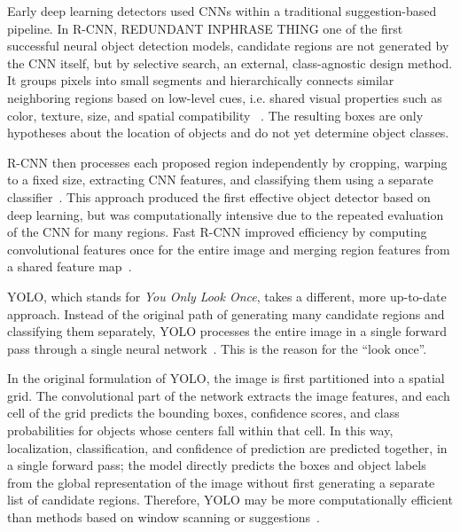 Early deep learning detectors used CNNs within a traditional suggestion-based pipeline. In R-CNN, REDUNDANT INPHRASE THING one of the first successful neural object detection models, candidate regions are not generated by the CNN itself, but by selective search, an external, class-agnostic design method. It groups pixels into small segments and hierarchically connects similar neighboring regions based on low-level cues, i.e. shared visual properties such as color, texture, size, and spatial compatibility ~\cite{uijlings_selective_2013}. The resulting boxes are only hypotheses about the location of objects and do not yet determine object classes.

R-CNN then processes each proposed region independently by cropping, warping to a fixed size, extracting CNN features, and classifying them using a separate classifier~\cite{girshick_rich_2014}. This approach produced the first effective object detector based on deep learning, but was computationally intensive due to the repeated evaluation of the CNN for many regions. Fast R-CNN improved efficiency by computing convolutional features once for the entire image and merging region features from a shared feature map~\cite{girshick_fast_2015}.



YOLO, which stands for \emph{You Only Look Once}, takes a different, more up-to-date approach. Instead of the original path of generating many candidate regions and classifying them separately, YOLO processes the entire image in a single forward pass through a single neural network~\cite{redmon_you_2016}. This is the reason for the \enquote{look once}.

In the original formulation of YOLO, the image is first partitioned into a spatial grid. The convolutional part of the network extracts the image features, and each cell of the grid predicts the bounding boxes, confidence scores, and class probabilities for objects whose centers fall within that cell. In this way, localization, classification, and confidence of prediction are predicted together, in a single forward pass; the model directly predicts the boxes and object labels from the global representation of the image without first generating a separate list of candidate regions. Therefore, YOLO may be more computationally efficient than methods based on window scanning or suggestions~\cite[Sec.~50.4.1.4]{foundationsCVbook}\cite{redmon_you_2016}.

